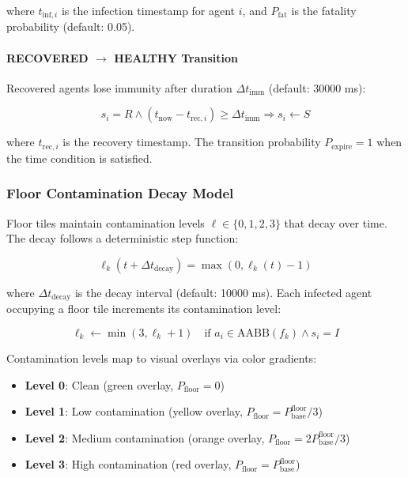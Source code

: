 where $t_{\text{inf},i}$ is the infection timestamp for agent $i$, and $P_{\text{fat}}$ is the fatality probability (default: 0.05).

\paragraph{RECOVERED $\to$ HEALTHY Transition}

Recovered agents lose immunity after duration $\Delta t_{\text{imm}}$ (default: 30000 ms):

\begin{equation}
\label{eq:immunity-expire}
s_i = R \land (t_{\text{now}} - t_{\text{rec},i}) \geq \Delta t_{\text{imm}} \Rightarrow s_i \leftarrow S
\end{equation}

where $t_{\text{rec},i}$ is the recovery timestamp. The transition probability $P_{\text{expire}} = 1$ when the time condition is satisfied.

\subsubsection{Floor Contamination Decay Model}

Floor tiles maintain contamination levels $\ell \in \{0, 1, 2, 3\}$ that decay over time. The decay follows a deterministic step function:

\begin{equation}
\label{eq:decay}
\ell_k(t + \Delta t_{\text{decay}}) = \max(0, \ell_k(t) - 1)
\end{equation}

where $\Delta t_{\text{decay}}$ is the decay interval (default: 10000 ms). Each infected agent occupying a floor tile increments its contamination level:

\begin{equation}
\label{eq:contaminate}
\ell_k \leftarrow \min(3, \ell_k + 1) \quad \text{if } a_i \in \text{AABB}(f_k) \land s_i = I
\end{equation}

Contamination levels map to visual overlays via color gradients:
\begin{itemize}
    \item \textbf{Level 0}: Clean (green overlay, $P_{\text{floor}} = 0$)
    \item \textbf{Level 1}: Low contamination (yellow overlay, $P_{\text{floor}} = P_{\text{base}}^{\text{floor}} / 3$)
    \item \textbf{Level 2}: Medium contamination (orange overlay, $P_{\text{floor}} = 2P_{\text{base}}^{\text{floor}} / 3$)
    \item \textbf{Level 3}: High contamination (red overlay, $P_{\text{floor}} = P_{\text{base}}^{\text{floor}}$)
\end{itemize}

